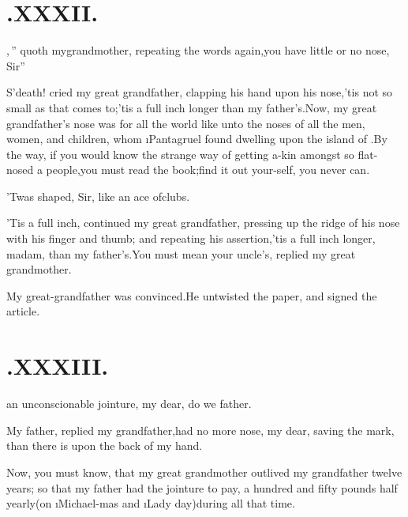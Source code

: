 \documentclass[twoside]{article}
\begin{document}
\section{\chapstrut {}.\quad  XXXII.}

,\,”
quoth my\break grandmother, repeating the\break
words again,\tsk\lqq you have little or no\break
\lqq nose, Sir”\tsh

S’death! cried my great grandfather, clapping his hand
upon his nose,\tsk ’tis not so small as that comes
to;\tsk ’tis a full inch longer than my
father’s.\tsh Now, my great grandfather’s nose was
for all
the world like unto the noses of all the 
men, women, and children, whom \i{Pan\-tagruel} found dwelling upon the
island of 
.\tsh By the way, if you would 
know the strange way of getting a-kin 
amongst so flat-nosed a people,\tsh you
must read the book;\tsk find it out your-\break self,
you never can.\tsh

\tsh ’Twas shaped, Sir, like an ace of\break clubs.

\tsh ’Tis a full inch, continued my great grandfather,
pressing up the ridge of his nose with his finger and thumb; and
repeating his assertion,\tsh ’tis a full inch longer,
madam, than my father’s\tsh.\break You must mean your
uncle’s, replied my great grandmother.

\tsh My great-grandfather was convinced.\tsk He
untwisted the paper, and signed the article.

\section{.\quad  XXXIII.}

 an unconscionable\break
jointure, my dear, do we
father.

My father, replied my grandfather,\break had no more nose, my dear,
saving the mark, than there is upon the back of my\break
hand.\tsh

\tsk Now, you must know, that my great grandmother outlived my
grandfather twelve years; so that my father
had the
jointure to pay, a hundred and fifty pounds half yearly\tsk (on
\i{Michael-\break mas} and \i{Lady day})\tsk during all
that\break
time.
\end{document}
